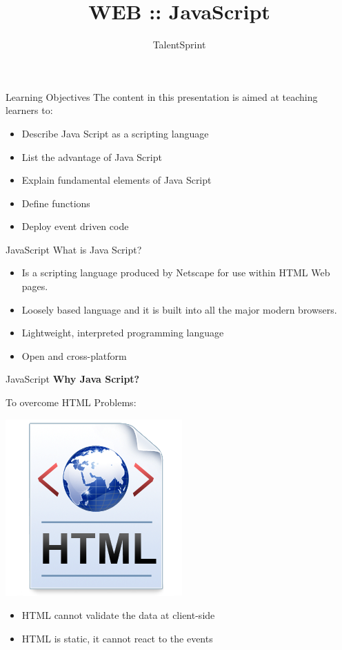 \documentclass[14pt]{beamer}
\title{WEB :: JavaScript}
\author[TS]{TalentSprint}
\institute[L\&D]{Licensed To Skill}
\begin{document}
\begin{frame}
  \titlepage
\end{frame}

\begin{frame}{Learning Objectives}
The content in this presentation is aimed at teaching  learners to:
  \begin{itemize}
  \item Describe Java Script as a scripting language 
  \item List the advantage of Java Script  
  \item Explain fundamental elements of Java Script 
  \item Define functions
  \item Deploy event driven code
  \end{itemize}
\end{frame}

\begin{frame}{JavaScript}
What is Java Script?
\begin{itemize}
 \item Is a scripting language produced by Netscape for use within HTML  Web pages.
 \item Loosely based language and it is built into all the major modern browsers.
 \item Lightweight, interpreted programming language
 \item Open and cross-platform
\end{itemize}
\end{frame}

\begin{frame}{JavaScript}
\textbf{Why Java Script?}

\vspace{1pc}
To overcome HTML Problems:

\vspace{1pc}
\begin{minipage}{1.5cm}
\includegraphics[scale=.25]{javascript-html.png}
\end{minipage}
\quad
\begin{minipage}{7.5cm}
\begin{itemize}
 \item HTML cannot validate the data at client-side
 \item HTML is static, it cannot react to the events
\end{itemize}
\end{minipage}
\end{frame}
\end{document}
